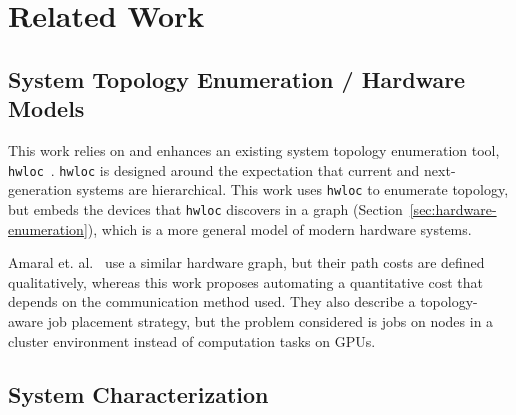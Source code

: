 \chapter{Related Work}
\label{ch:related}

\section{System Topology Enumeration / Hardware Models}

This work relies on and enhances an existing system topology enumeration tool, \texttt{hwloc}~\cite{broquedis2010hwloc}.
\texttt{hwloc} is designed around the expectation that current and next-generation systems are hierarchical.
This work uses \texttt{hwloc} to enumerate topology, but embeds the devices that \texttt{hwloc} discovers in a graph (Section~\ref{sec:hardware-enumeration}), which is a more general model of modern hardware systems.

Amaral et. al.~\cite{amaral2017topology} use a similar hardware graph, but their path costs are defined qualitatively, whereas this work proposes automating a quantitative cost that depends on the communication method used.
They also describe a topology-aware job placement strategy, but the problem considered is jobs on nodes in a cluster environment instead of computation tasks on GPUs.

\section{System Characterization}

